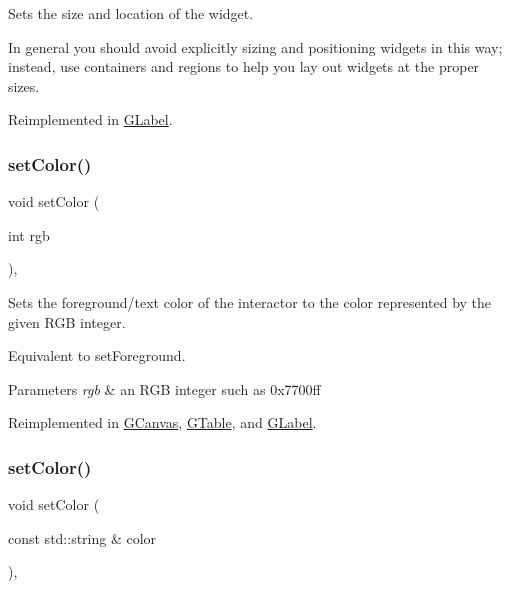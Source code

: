 Sets the size and location of the widget. 

In general you should avoid explicitly sizing and positioning widgets in this way; instead, use containers and regions to help you lay out widgets at the proper sizes. 

Reimplemented in \mbox{\hyperlink{classGLabel_a3ed96c7e7adaf111848a90978621066c}{G\+Label}}.

\mbox{\label{classGInteractor_ab1f5cc0f5cc6bbbd716a526c61f1081d}} 
\subsubsection{\texorpdfstring{set\+Color()}{setColor()}\hspace{0.1cm}{\footnotesize\ttfamily [1/2]}}
{\footnotesize\ttfamily void set\+Color (\begin{DoxyParamCaption}\item[{int}]{rgb }\end{DoxyParamCaption})\hspace{0.3cm}{\ttfamily [virtual]}, {\ttfamily [inherited]}}



Sets the foreground/text color of the interactor to the color represented by the given R\+GB integer. 

Equivalent to set\+Foreground. 
\begin{DoxyParams}{Parameters}
{\em rgb} & an R\+GB integer such as 0x7700ff \\
\hline
\end{DoxyParams}


Reimplemented in \mbox{\hyperlink{classGCanvas_a292eb0ce61f3fdb1d28b17e1e34928f7}{G\+Canvas}}, \mbox{\hyperlink{classGTable_afd1f50a2c4695c79b8633d860bce5398}{G\+Table}}, and \mbox{\hyperlink{classGLabel_afd1f50a2c4695c79b8633d860bce5398}{G\+Label}}.

\mbox{\label{classGInteractor_a61374df6c11b52cfbb0815decdbaebc6}} 
\subsubsection{\texorpdfstring{set\+Color()}{setColor()}\hspace{0.1cm}{\footnotesize\ttfamily [2/2]}}
{\footnotesize\ttfamily void set\+Color (\begin{DoxyParamCaption}\item[{const std\+::string \&}]{color }\end{DoxyParamCaption})\hspace{0.3cm}{\ttfamily [virtual]}, {\ttfamily [inherited]}}



